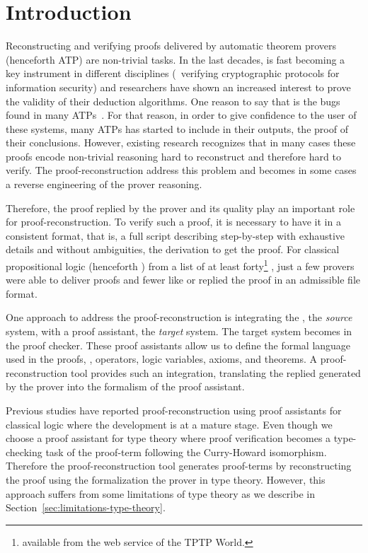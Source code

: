 \documentclass[../main.tex]{subfiles}
\begin{document}

\section{Introduction}
\label{sec:introduction}

Reconstructing and verifying proofs delivered by automatic theorem provers
(henceforth ATP) are non-trivial tasks.
In the last decades, \ATPs is fast becoming a key instrument in 
different disciplines (\eg~verifying cryptographic protocols for information security) and researchers have shown an increased interest to prove the validity of their deduction algorithms.
One reason to say that is the bugs found in many ATPs~\cite{Keller2013,Bohme2011,Fleury2014}.
For that reason, in order to give confidence to the user of these systems,
many ATPs has started to include in their outputs, the proof of their
conclusions. However, existing research recognizes that in many cases these proofs encode non-trivial reasoning
hard to reconstruct and therefore hard to verify. The proof-reconstruction
address this problem and becomes in some cases a reverse engineering of the
prover reasoning.

Therefore, the proof replied by the prover and its quality play an important role for proof-reconstruction. To verify such a proof, it is necessary to have
it in a consistent format, that is, a full script 
describing step-by-step with exhaustive details and without ambiguities, the derivation to get the proof.
For classical propositional logic (henceforth \CPL) from a list of at least forty\footnote{\ATPs 
available from the web
service  of the TPTP World.} \ATPs, just a few
provers were able to deliver proofs and fewer like  or \Metis 
replied the proof in an admissible file format.

One approach to address the proof-reconstruction 
is integrating the \ATP, the \emph{source} system, with a proof assistant, the 
\emph{target} system.
The target system becomes in the proof checker. These proof assistants allow 
us to define the formal language used in the proofs, \ie, operators, logic 
variables, axioms, and theorems. A proof-reconstruction tool provides such an
integration, translating the replied generated by the prover into the formalism of the proof assistant.

Previous studies have reported proof-reconstruction using proof assistants for classical logic where the development is at a mature stage.
Even though we choose a proof assistant for type theory
where proof verification becomes a type-checking task of the proof-term following the Curry-Howard isomorphism. Therefore the proof-reconstruction tool generates proof-terms by reconstructing the proof using the formalization 
the prover in type theory. However, this approach suffers from some limitations of type theory as we describe in Section~\ref{sec:limitations-type-theory}.
\end{document}
